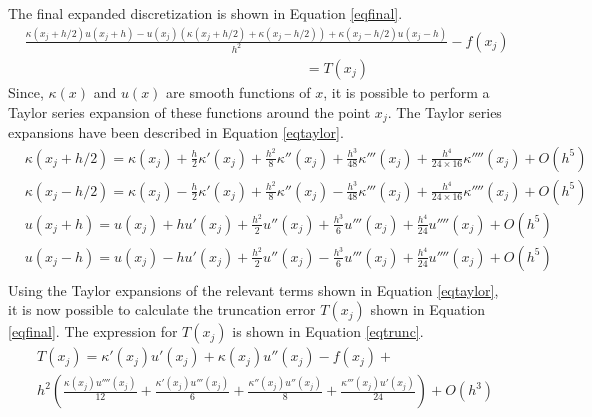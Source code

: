\documentclass[12pt,dvipsnames]{article}
\begin{document}
The final expanded discretization is shown in Equation \ref{eqfinal}.
\begin{equation} \label{eqfinal}
    \begin{aligned}
        &\frac{\kappa(x_j + h/2)u(x_j + h) - u(x_j)\left(\kappa(x_j + h/2) + \kappa(x_j - h/2)\right) + \kappa(x_j - h/2)u(x_j - h)}{h^2} -f(x_j) \\
        &  \quad \quad \quad \quad \quad \quad \quad \quad \quad \quad \quad \quad \quad \quad \quad \quad \quad \quad \quad \quad = T(x_j)
    \end{aligned}
\end{equation}
Since, $\kappa(x)$ and $u(x)$ are smooth functions of $x$, it is possible to perform a Taylor series expansion of these functions around the point $x_j$. The Taylor series expansions have been described in Equation \ref{eqtaylor}.
\begin{equation}\label{eqtaylor}
    \begin{aligned}
        & \kappa(x_j + h/2) = \kappa(x_j) + \frac{h}{2}\kappa'(x_j) + \frac{h^2}{8} \kappa''(x_j) + \frac{h^3}{48} \kappa'''(x_j) + \frac{h^4}{24 \times 16} \kappa''''(x_j) + O(h^5) \\
        & \kappa(x_j - h/2) = \kappa(x_j) - \frac{h}{2}\kappa'(x_j) + \frac{h^2}{8} \kappa''(x_j) - \frac{h^3}{48} \kappa'''(x_j) + \frac{h^4}{24 \times 16} \kappa''''(x_j) + O(h^5) \\
        & u(x_j + h) =  u(x_j) + h u'(x_j) + \frac{h^2}{2} u''(x_j) + \frac{h^3}{6} u'''(x_j) + \frac{h^4}{24} u''''(x_j) + O(h^5) \\
        & u(x_j - h) =  u(x_j) - h u'(x_j) + \frac{h^2}{2} u''(x_j) - \frac{h^3}{6} u'''(x_j) + \frac{h^4}{24} u''''(x_j) + O(h^5) \\
    \end{aligned}
\end{equation}
Using the Taylor expansions of the relevant terms shown in Equation \ref{eqtaylor}, it is now possible to calculate the truncation error $T(x_j)$ shown in Equation \ref{eqfinal}. The expression for $T(x_j)$ is shown in Equation \ref{eqtrunc}.
\begin{equation} \label{eqtrunc}
    \begin{aligned}
        & T(x_j) = \kappa'(x_j)u'(x_j)+ \kappa(x_j) u''(x_j) - f(x_j) + \\
        & h^2 \left( \frac{\kappa(x_j) u''''(x_j)}{12} + \frac{\kappa'(x_j) u'''(x_j)}{6} + \frac{\kappa''(x_j) u''(x_j)}{8} + \frac{\kappa'''(x_j) u'(x_j)}{24}  \right) + O(h^3)
    \end{aligned}
\end{equation}
\end{document}
